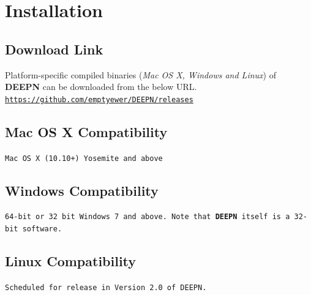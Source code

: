 \documentclass[11pt,fleqn]{book} %
\newcommand{\DEEPN}{\textbf{DEEPN }}
\begin{document}

\section{Installation}
\subsection{Download Link}\label{download link}

    Platform-specific compiled binaries (\emph{Mac OS X, Windows and Linux}) of \textbf{DEEPN} can be downloaded from the below URL. \\

    \texttt{\href{https://github.com/emptyewer/DEEPN/releases}{https://github.com/emptyewer/DEEPN/releases}}

    \subsection{Mac OS X Compatibility}\label{mac_install}

    \texttt{Mac OS X (10.10+) Yosemite and above}

    \subsection{Windows Compatibility}\label{windows_install}

    \texttt{64-bit or 32 bit Windows 7 and above. Note that \DEEPN itself is a 32-bit software.}

    \subsection{Linux Compatibility}\label{linux_install}

    \texttt{Scheduled for release in Version 2.0 of DEEPN.}
\end{document}
